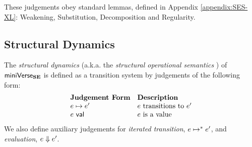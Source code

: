 

These judgements obey standard lemmas, defined in Appendix \ref{appendix:SES-XL}: Weakening, Substitution, Decomposition and Regularity.

\subsection{Structural Dynamics}\label{sec:dynamics-U}
The \emph{structural dynamics} (a.k.a. the \emph{structural operational semantics} \cite{DBLP:journals/jlp/Plotkin04a}) of $\mathsf{miniVerse}_\textbf{SE}$ is defined as a transition system by judgements of the following form:
\[\begin{array}{ll}
\textbf{Judgement Form} & \textbf{Description}\\
e \mapsto e' & \text{$e$ transitions to $e'$}\\
e~\mathsf{val} & \text{$e$ is a value}
\end{array}\]
We also define auxiliary judgements for \emph{iterated transition}, $e \mapsto^{*} e'$, and \emph{evaluation}, $e \Downarrow e'$.

